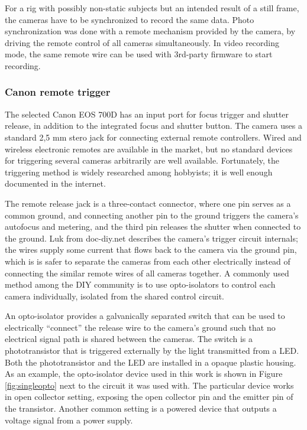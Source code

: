 For a rig with possibly non-static subjects but an intended result of a still frame, the cameras have to be synchronized to record the same data.
Photo synchronization was done with a remote mechanism provided by the camera, by driving the remote control of all cameras simultaneously.
In video recording mode, the same remote wire can be used with 3rd-party firmware to start recording.


\subsubsection{Canon remote trigger} %

The selected Canon EOS 700D has an input port for focus trigger and shutter release, in addition to the integrated focus and shutter button.
The camera uses a standard 2,5 mm stero jack for connecting external remote controllers.
Wired and wireless electronic remotes are available in the market, but no standard devices for triggering several cameras arbitrarily are well available. %
Fortunately, the triggering method is widely researched among hobbyists; it is well enough documented in the internet.

The remote release jack is a three-contact connector, where one pin serves as a common ground, and connecting another pin to the ground triggers the camera's autofocus and metering, and the third pin releases the shutter when connected to the ground.
Luk from doc-diy.net \cite{docdiy} describes the camera's trigger circuit internals; the wires supply some current that flows back to the camera via the ground pin, which is is safer to separate the cameras from each other electrically instead of connecting the similar remote wires of all cameras together.
A commonly used method among the DIY community is to use opto-isolators to control each camera individually, isolated from the shared control circuit.

An opto-isolator provides a galvanically separated switch that can be used to electrically ``connect'' the release wire to the camera's ground such that no electrical signal path is shared between the cameras.
The switch is a phototransistor that is triggered externally by the light transmitted from a LED.
Both the phototransistor and the LED are installed in a opaque plastic housing.
As an example, the opto-isolator device used in this work is shown in Figure \ref{fig:singleopto} next to the circuit it was used with.
The particular device works in open collector setting, exposing the open collector pin and the emitter pin of the transistor.
Another common setting is a powered device that outputs a voltage signal from a power supply.

